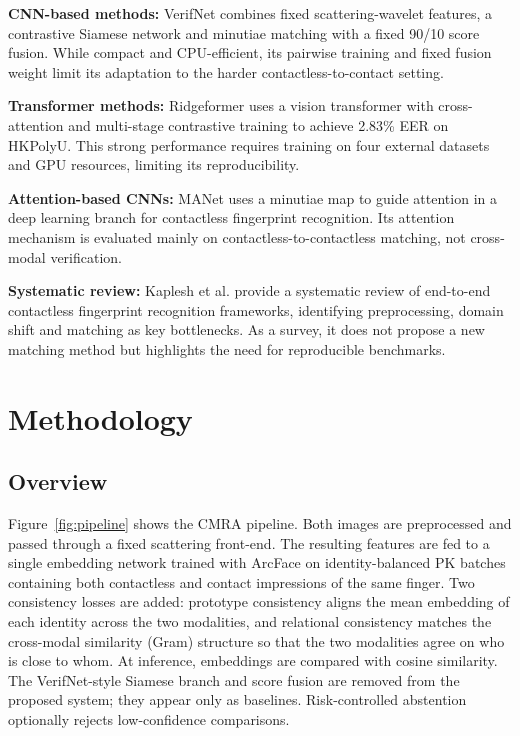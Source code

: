 \documentclass[12pt,a4paper]{article}
\begin{document}
\textbf{CNN-based methods:} VerifNet combines fixed scattering-wavelet features, a contrastive Siamese network and minutiae matching with a fixed 90/10 score fusion. While compact and CPU-efficient, its pairwise training and fixed fusion weight limit its adaptation to the harder contactless-to-contact setting.

\textbf{Transformer methods:} Ridgeformer uses a vision transformer with cross-attention and multi-stage contrastive training to achieve 2.83\% EER on HKPolyU. This strong performance requires training on four external datasets and GPU resources, limiting its reproducibility.

\textbf{Attention-based CNNs:} MANet uses a minutiae map to guide attention in a deep learning branch for contactless fingerprint recognition. Its attention mechanism is evaluated mainly on contactless-to-contactless matching, not cross-modal verification.

\textbf{Systematic review:} Kaplesh et al. provide a systematic review of end-to-end contactless fingerprint recognition frameworks, identifying preprocessing, domain shift and matching as key bottlenecks. As a survey, it does not propose a new matching method but highlights the need for reproducible benchmarks.

\section{Methodology}

\subsection{Overview}
Figure~\ref{fig:pipeline} shows the CMRA pipeline. Both images are preprocessed and passed through a fixed scattering front-end. The resulting features are fed to a single embedding network trained with ArcFace on identity-balanced PK batches containing both contactless and contact impressions of the same finger. Two consistency losses are added: prototype consistency aligns the mean embedding of each identity across the two modalities, and relational consistency matches the cross-modal similarity (Gram) structure so that the two modalities agree on who is close to whom. At inference, embeddings are compared with cosine similarity. The VerifNet-style Siamese branch and score fusion are removed from the proposed system; they appear only as baselines. Risk-controlled abstention optionally rejects low-confidence comparisons.
\end{document}
